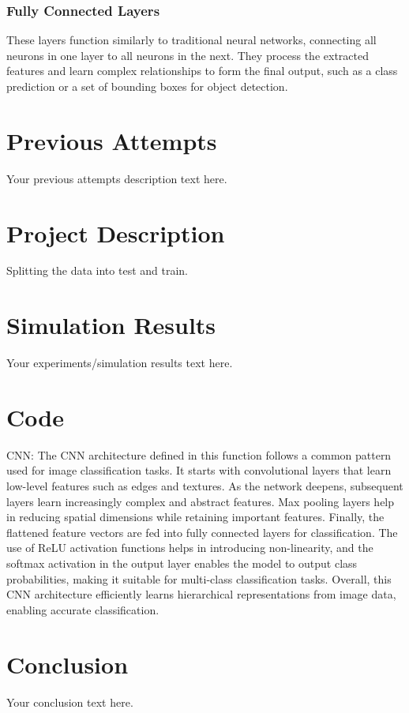 \documentclass{article}
\begin{document}
\subsubsection{Fully Connected Layers}
These layers function similarly to traditional neural networks, connecting all neurons in one layer to all neurons in the next. They process the extracted features and learn complex relationships to form the final output, such as a class prediction or a set of bounding boxes for object detection.


\section{Previous Attempts}
Your previous attempts description text here.

\section{Project Description}
Splitting the data into test and train.


\section{Simulation Results}
Your experiments/simulation results text here.

\section{Code}
CNN:
    The CNN architecture defined in this function follows a common pattern used for image classification tasks.
    It starts with convolutional layers that learn low-level features such as edges and textures.
    As the network deepens, subsequent layers learn increasingly complex and abstract features.
    Max pooling layers help in reducing spatial dimensions while retaining important features.
    Finally, the flattened feature vectors are fed into fully connected layers for classification.
    The use of ReLU activation functions helps in introducing non-linearity,
    and the softmax activation in the output layer enables the model to output class probabilities,
    making it suitable for multi-class classification tasks.
    Overall, this CNN architecture efficiently learns hierarchical representations from image data,
    enabling accurate classification.

\section{Conclusion}
Your conclusion text here.
\end{document}
